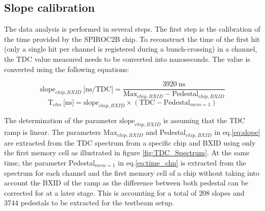 \begin{table}[t]
	\centering
	\caption{Table with the statistic before and after selection used for timing calibration.}
	\label{table:mu_elec_runs}
\end{table}

\subsection{Slope calibration}
\label{subsec:slope_calib}

The data analysis is performed in several steps. The first step is the calibration of the time provided by the SPIROC2B chip. To reconstruct the time of the first hit (only a single hit per channel is registered during a bunch-crossing) in a channel, the TDC value measured needs to be converted into nanoseconds. The value is converted using the following equations:

\begin{equation} \label{eq:slope}
	\text{slope}_{chip, BXID} \: \text{[ns/TDC]} = \frac{3920 \: \text{ns}}{\text{Max}_{chip, BXID} - \text{Pedestal}_{chip, BXID}}
\end{equation}
\begin{equation} \label{eq:time_chn}
	\text{T}_{chn} \: \text{[ns]} = \text{slope}_{chip, BXID} \times (\text{TDC} - \text{Pedestal}_{mem=1} )
\end{equation}

The determination of the parameter $\text{slope}_{chip, BXID}$ is assuming that the TDC ramp is linear. The parameters Max$_{chip, BXID}$ and Pedestal$_{chip, BXID}$ in eq.\ref{eq:slope} are extracted from the TDC spectrum from a specific chip and BXID using only the first memory cell as illustrated in figure \ref{fig:TDC_Spectrum}. At the same time, the parameter Pedestal$_{mem=1}$ in eq.\ref{eq:time_chn} is extracted from the spectrum for each channel and the first memory cell of a chip without taking into account the BXID of the ramp as the difference between both pedestal can be corrected for at a later stage. This is accounting for a total of 208 slopes and 3744 pedestals to be extracted for the testbeam setup.

